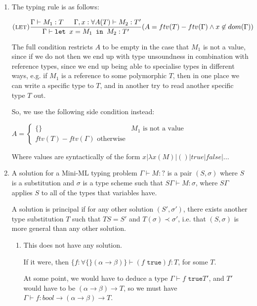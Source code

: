 


\begin{enumerate}[label=(\alph*)]
  \item

    The typing rule is as follows:

    \[
      \textsc{(let)}\frac{\Gamma \vdash M_1 : T \hspace{15pt} \Gamma, x:\forall A(T) \vdash M_2 : T'}{\Gamma \vdash \texttt{let }x=M_1\texttt{ in }M_2 : T'}(A = ftv(T) - ftv(\Gamma) \wedge x \not \in dom(\Gamma))
    \] 

    The full condition restricts $A$ to be empty in the case that $M_1$ is not a value, since if we do not then we end up with type unsoundness in combination with reference types, since we end up being able to specialise types in different ways, e.g. if $M_1$ is a reference to some polymorphic $T$, then in one place we can write a specific type to $T$, and in another try to read another specific type $T$ out.

    So, we use the following side condition instead:

    $A = \begin{cases}\{\} & M_1 \text{ is not a value}\\ftv(T) - ftv(\Gamma) \text{ otherwise}\end{cases}$

    Where values are syntactically of the form $x | \lambda x(M) | () | true | false |...$

  \item
    A solution for a Mini-ML typing problem $\Gamma \vdash M : ?$ is a pair $(S, \sigma)$ where $S$ is a substitution and $\sigma$ is a type scheme such that $S \Gamma \vdash M : \sigma$, where $S \Gamma$ applies $S$ to all of the types that variables have.

    A solution is principal if for any other solution $(S', \sigma')$, there exists another type substitution $T$ such that $T S = S'$ and $T(\sigma) \prec \sigma'$, i.e. that $(S, \sigma)$ is more general than any other solution.

    \begin{enumerate}[label=(\roman*)]
      \item
        This does not have any solution.

        If it were, then $\{f : \forall \{\}(\alpha \rightarrow \beta)\} \vdash (f \texttt{ true}) f : T$, for some $T$.

        At some point, we would have to deduce a type $\Gamma \vdash f \texttt{ true} T'$, and $T'$ would have to be $(\alpha \rightarrow \beta) \rightarrow T$, so we must have $\Gamma \vdash f : bool \rightarrow (\alpha \rightarrow \beta) \rightarrow T$.


\end{enumerate}
\end{enumerate}
